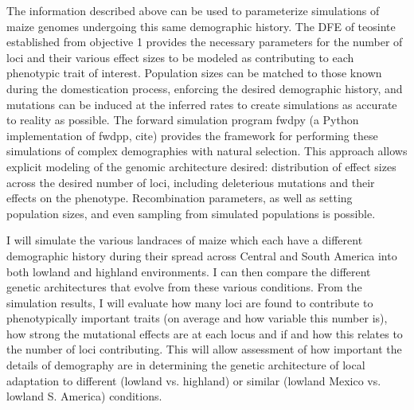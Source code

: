 The information described above can be used to parameterize simulations of maize genomes undergoing this same demographic history. The DFE of teosinte established from objective 1 provides the necessary parameters for the number of loci and their various effect sizes to be modeled as contributing to each phenotypic trait of interest. Population sizes can be matched to those known during the domestication process, enforcing the desired demographic history, and mutations can be induced at the inferred rates to create simulations as accurate to reality as possible.  The forward simulation program fwdpy (a Python implementation of fwdpp, cite) provides the framework for performing these simulations of complex demographies with natural selection. This approach allows explicit modeling of the genomic architecture desired: distribution of effect sizes across the desired number of loci, including deleterious mutations and their effects on the phenotype. Recombination parameters, as well as setting population sizes, and even sampling from simulated populations is possible.

I will simulate the various landraces of maize which each have a different demographic history during their spread across Central and South America into both lowland and highland environments. I can then compare the different genetic architectures that evolve from these various conditions. From the simulation results, I will evaluate how many loci are found to contribute to phenotypically important traits (on average and how variable this number is), how strong the mutational effects are at each locus and if and how this relates to the number of loci contributing. This will allow assessment of how important the details of demography are in determining the genetic architecture of local adaptation to different (lowland vs. highland) or similar (lowland Mexico vs. lowland S. America) conditions.

